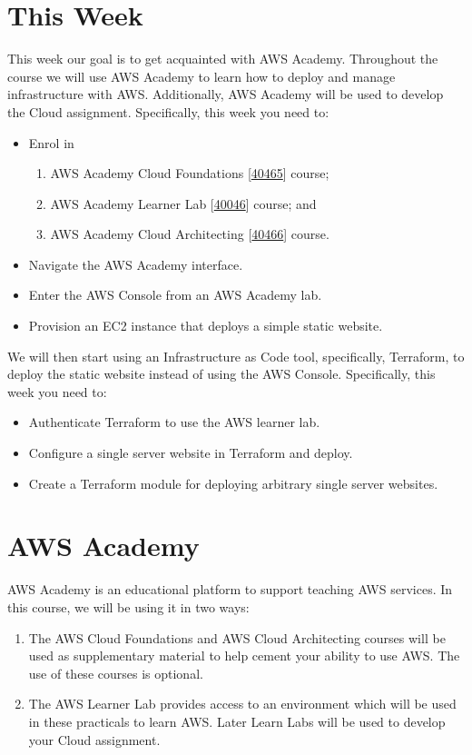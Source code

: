 \documentclass{csse4400}
\begin{document}
\section{This Week}
This week our goal is to get acquainted with AWS Academy.
Throughout the course we will use AWS Academy to learn how to deploy and manage infrastructure with AWS.
Additionally, AWS Academy will be used to develop the Cloud assignment.
Specifically, this week you need to:
\begin{itemize}
    \item Enrol in
    \begin{enumerate}
        \item AWS Academy Cloud Foundations [\href{https://awsacademy.instructure.com/courses/40465}{40465}] course;
        \item AWS Academy Learner Lab [\href{https://awsacademy.instructure.com/courses/40466}{40046}] course; and
        \item AWS Academy Cloud Architecting [\href{https://awsacademy.instructure.com/courses/40046}{40466}] course.
    \end{enumerate}
    \item Navigate the AWS Academy interface.
    \item Enter the AWS Console from an AWS Academy lab.
    \item Provision an EC2 instance that deploys a simple static website.
\end{itemize}

We will then start using an Infrastructure as Code tool,
specifically, Terraform,
to deploy the static website instead of using the AWS Console.
Specifically, this week you need to:
\begin{itemize}
    \item Authenticate Terraform to use the AWS learner lab.
    \item Configure a single server website in Terraform and deploy.
    \item Create a Terraform module for deploying arbitrary single server websites.
\end{itemize}

\section{AWS Academy}
AWS Academy is an educational platform to support teaching AWS services.
In this course, we will be using it in two ways:
\begin{enumerate}
    \item The AWS Cloud Foundations and AWS Cloud Architecting courses will be used as supplementary material to help cement your ability to use AWS.
        The use of these courses is optional.
    \item The AWS Learner Lab provides access to an environment which will be used in these practicals to learn AWS. 
        Later Learn Labs will be used to develop your Cloud assignment.
\end{enumerate}
\end{document}
